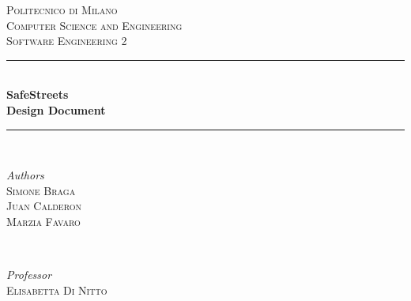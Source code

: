 \documentclass[a4paper]{article}
\begin{document}

\begin{titlepage}
	\newcommand{\HRule}{\rule{\linewidth}{0.5mm}}
	
	\center
	
	
	\textsc{\LARGE Politecnico di Milano}\\[1.5cm]
	
	\textsc{\Large Computer Science and Engineering}\\[0.5cm]
	
	\textsc{\large Software Engineering 2}\\[0.5cm]
	
	
	\HRule\\[0.4cm]
	
	{\huge\bfseries SafeStreets\medskip\\
	\normalsize Design Document}\\[0.4cm]
	
	\HRule\\[1.5cm]
	
	
	\begin{minipage}{0.4\textwidth}
		\begin{flushleft}
			\large
			\textit{Authors}\\
			\textsc{Simone Braga}\\
			\textsc{Juan Calderon}\\
			\textsc{Marzia Favaro}
		\end{flushleft}
	\end{minipage}
	~
	\begin{minipage}{0.4\textwidth}
		\begin{flushright}
			\large
			\textit{Professor}\\
			\textsc{Elisabetta Di Nitto}\linebreak\linebreak
		\end{flushright}
	\end{minipage}
	

\end{titlepage}
\end{document}
